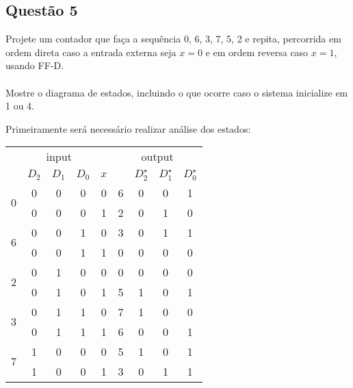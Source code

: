 \documentclass{article}
\begin{document}
\subsection{Questão 5}
    \begin{exercise}
        Projete um contador que faça a sequência 0, 6, 3, 7, 5, 2 e repita, percorrida em ordem direta caso a entrada externa seja $x=0$ e em ordem reversa caso $x=1$, usando FF-D.\\\\
        Mostre o diagrama de estados, incluindo o que ocorre caso o sistema inicialize em 1 ou 4.
    \end{exercise}
    \begin{resolution}
        Primeiramente será necessário realizar análise dos estados:
        \begin{table}[H]
            \centering\begin{tabular}[]{c|cccc|c|ccc}
                \multicolumn{5}{c|}{input}               & \multicolumn{4}{c}{output}            \\
                                  &$D_2$&$D_1$&$D_0$&$x$ &   &$D_2^\star$&$D_1^\star$&$D_0^\star$\\\hline
                \multirow{2}{*}{0}& 0   & 0   & 0   &  0 & 6 & 0         & 0         & 1         \\
                                  & 0   & 0   & 0   &  1 & 2 & 0         & 1         & 0         \\
                \multirow{2}{*}{6}& 0   & 0   & 1   &  0 & 3 & 0         & 1         & 1         \\
                                  & 0   & 0   & 1   &  1 & 0 & 0         & 0         & 0         \\
                \multirow{2}{*}{2}& 0   & 1   & 0   &  0 & 0 & 0         & 0         & 0         \\
                                  & 0   & 1   & 0   &  1 & 5 & 1         & 0         & 1         \\
                \multirow{2}{*}{3}& 0   & 1   & 1   &  0 & 7 & 1         & 0         & 0         \\
                                  & 0   & 1   & 1   &  1 & 6 & 0         & 0         & 1         \\
                \multirow{2}{*}{7}& 1   & 0   & 0   &  0 & 5 & 1         & 0         & 1         \\
                                  & 1   & 0   & 0   &  1 & 3 & 0         & 1         & 1         \\

\end{tabular}
\end{table}
\end{resolution}
\end{document}
